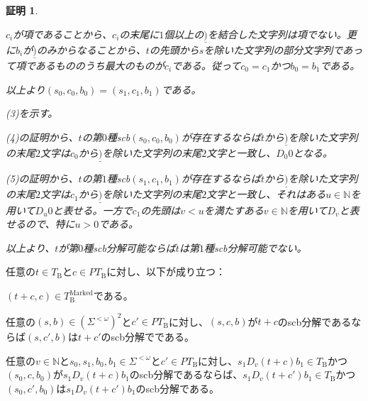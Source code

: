 \documentclass[dvipdfmx,uplatex]{jsarticle}
\theoremstyle{customnonumberbreakfortheorem}
\theoremstyle{customnonumberbreakforproof}
\newtheorem{hideableproof}{証明}
\begin{document}
\begin{hideableproof}
\begin{indented}
\begin{indented}
			\item \(c_i\)が項であることから、\(c_i\)の末尾に\(1\)個以上の\(\underline{)}\)を結合した文字列は項でない。更に\(b_i\)が\(\underline{)}\)のみからなることから、\(t\)の先頭から\(s\)を除いた文字列の部分文字列であって項であるもののうち最大のものが\(c_i\)である。従って\(c_0 = c_1\)かつ\(b_0 = b_1\)である。
			\item 以上より\((s_0,c_0,b_0) = (s_1,c_1,b_1)\)である。
		\end{indented}
		\item (3)を示す。
		\begin{indented}
			\item (4)の証明から、\(t\)の第\(0\)種scb\((s_0,c_0,b_0)\)が存在するならば\(t\)から\(\underline{)}\)を除いた文字列の末尾\(2\)文字は\(c_0\)から\(\underline{)}\)を除いた文字列の末尾\(2\)文字と一致し、\(D_0 0\)となる。
			\item (5)の証明から、\(t\)の第\(1\)種scb\((s_1,c_1,b_1)\)が存在するならば\(t\)から\(\underline{)}\)を除いた文字列の末尾\(2\)文字は\(c_1\)から\(\underline{)}\)を除いた文字列の末尾\(2\)文字と一致し、それはある\(u \in \mathbb{N}\)を用いて\(D_u 0\)と表せる。一方で\(c_1\)の先頭は\(v < u\)を満たすある\(v \in \mathbb{N}\)を用いて\(D_v\)と表せるので、特に\(u > 0\)である。
			\item 以上より、\(t\)が第\(0\)種scb分解可能ならば\(t\)は第\(1\)種scb分解可能でない。
		\end{indented}
	\end{indented}
\end{hideableproof}

\begin{corollary}[加法とscb分解の関係]\label{加法とscb分解の関係}
	任意の\(t \in T_{\textrm{B}}\)と\(c \in PT_{\textrm{B}}\)に対し、以下が成り立つ：
	\begin{penumerate}
		\item \((t+c,c) \in T_{\textrm{B}}^{\textrm{Marked}}\)である。
		\item 任意の\((s,b) \in (\Sigma^{< \omega})^2\)と\(c' \in PT_{\textrm{B}}\)に対し、\((s,c,b)\)が\(t+c\)のscb分解であるならば\((s,c',b)\)は\(t+c'\)のscb分解でである。
		\item 任意の\(v \in \mathbb{N}\)と\(s_0,s_1,b_0,b_1 \in \Sigma^{< \omega}\)と\(c' \in PT_{\textrm{B}}\)に対し、\(s_1 D_v(t+c) b_1 \in T_{\textrm{B}}\)かつ\((s_0,c,b_0)\)が\(s_1 D_v(t+c) b_1\)のscb分解であるならば、\(s_1 D_v(t+c') b_1 \in T_{\textrm{B}}\)かつ\((s_0,c',b_0)\)は\(s_1 D_v(t+c') b_1\)のscb分解である。
	\end{penumerate}
\end{corollary}
\end{document}
